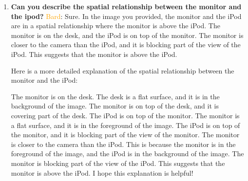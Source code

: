 \begin{enumerate}
    \item \textbf{Can you describe the spatial relationship between the monitor and the ipod?}
    \subitem \textcolor{orange}{Bard}: 
    Sure. In the image you provided, the monitor and the iPod are in a spatial relationship where the monitor is above the iPod. The monitor is on the desk, and the iPod is on top of the monitor. The monitor is closer to the camera than the iPod, and it is blocking part of the view of the iPod. This suggests that the monitor is above the iPod.
    
    Here is a more detailed explanation of the spatial relationship between the monitor and the iPod:
    
    The monitor is on the desk. The desk is a flat surface, and it is in the background of the image. The monitor is on top of the desk, and it is covering part of the desk.
    The iPod is on top of the monitor. The monitor is a flat surface, and it is in the foreground of the image. The iPod is on top of the monitor, and it is blocking part of the view of the monitor.
    The monitor is closer to the camera than the iPod. This is because the monitor is in the foreground of the image, and the iPod is in the background of the image.
    The monitor is blocking part of the view of the iPod. This suggests that the monitor is above the iPod.
    I hope this explanation is helpful!
    

\end{enumerate}
